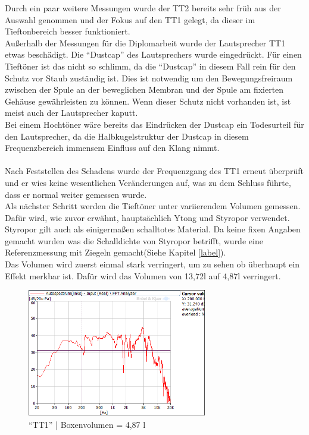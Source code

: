 \newpage
Durch ein paar weitere Messungen wurde der TT2 bereits sehr früh aus der Auswahl genommen und der Fokus auf den TT1 gelegt, da dieser im Tieftonbereich besser funktioniert.
\\
Außerhalb der Messungen für die Diplomarbeit wurde der Lautsprecher TT1 etwas beschädigt.
Die \enquote{Dustcap} des Lautsprechers wurde eingedrückt.
Für einen Tieftöner ist das nicht so schlimm, da die \enquote{Dustcap} in diesem Fall rein für den Schutz vor Staub zuständig ist.
Dies ist notwendig um den Bewegungsfreiraum zwischen der Spule an der beweglichen Membran und der Spule am fixierten Gehäuse gewährleisten zu können.
Wenn dieser Schutz nicht vorhanden ist, ist meist auch der Lautsprecher kaputt.\\
Bei einem Hochtöner wäre bereits das Eindrücken der Dustcap ein Todesurteil für den Lautsprecher, da die Halbkugelstruktur der Dustcap in diesem Frequenzbereich immensem Einfluss auf den Klang nimmt.
\\ \\
Nach Feststellen des Schadens wurde der Frequenzgang des TT1 erneut überprüft und er wies keine wesentlichen Veränderungen auf, was zu dem Schluss führte, dass er normal weiter gemessen wurde.\\
Als nächster Schritt werden die Tieftöner unter variierendem Volumen gemessen.
Dafür wird, wie zuvor erwähnt, hauptsächlich Ytong und Styropor verwendet.
Styropor gilt auch als einigermaßen schalltotes Material.
Da keine fixen Angaben gemacht wurden was die Schalldichte von Styropor betrifft, wurde eine Referenzmessung mit Ziegeln gemacht(Siehe Kapitel \ref{label}). %
\\
Das Volumen wird zuerst einmal stark verringert, um zu sehen ob überhaupt ein Effekt merkbar ist.
Dafür wird das Volumen von 13,72l auf 4,87l verringert.
\begin{figure} [H]
	\centering
	\includegraphics[width=0.7\textwidth]{img/LSMessung/TT/TT1silikon_4-87lVolumen.png}
	\caption{\enquote{TT1} | Boxenvolumen = 4,87 l}
	\label {fig:5.3.4.3}
\end{figure}













